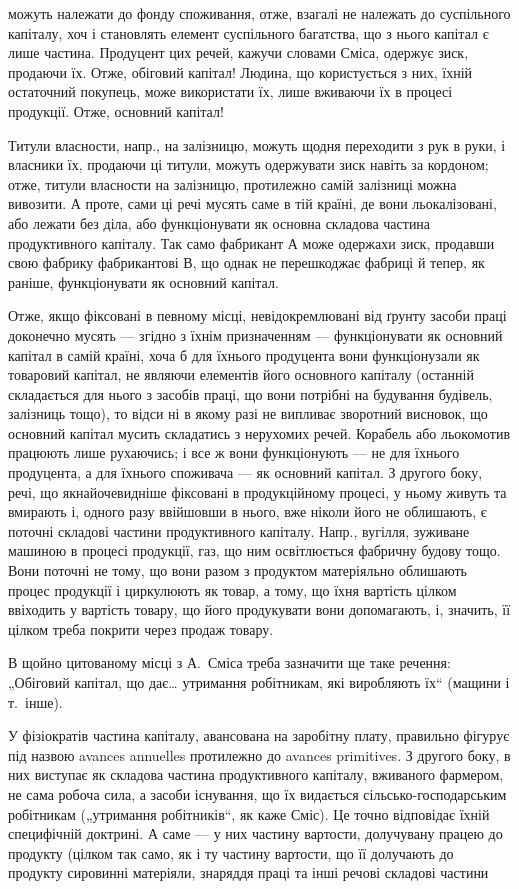 \parcont{}  %
можуть належати до фонду споживання, отже, взагалі не належать до
суспільного капіталу, хоч і становлять елемент суспільного багатства, що
з нього капітал є лише частина. Продуцент цих речей, кажучи словами
Сміса, одержує зиск, продаючи їх. Отже, обіговий капітал! Людина, що
користується з них, їхній остаточний покупець, може використати їх, лише
вживаючи їх в процесі продукції. Отже, основний капітал!

Титули власности, напр., на залізницю, можуть щодня переходити з
рук в руки, і власники їх, продаючи ці титули, можуть одержувати зиск
навіть за кордоном; отже, титули власности на залізницю, протилежно
самій залізниці можна вивозити. А проте, сами ці речі мусять саме в тій
країні, де вони льокалізовані, або лежати без діла, або функціонувати як
основна складова частина продуктивного капіталу. Так само фабрикант
$А$ може одержахи зиск, продавши свою фабрику фабрикантові $В$, що однак
не перешкоджає фабриці й тепер, як раніше, функціонувати як основний
капітал.

Отже, якщо фіксовані в певному місці, невідокремлювані від ґрунту
засоби праці доконечно мусять — згідно з їхнім призначенням — функціонувати
як основний капітал в самій країні, хоча б для їхнього продуцента
вони функціонузали як товаровий капітал, не являючи елементів його
основного капіталу (останній складається для нього з засобів праці, що
вони потрібні на будування будівель, залізниць тощо), то відси ні в
якому разі не випливає зворотний висновок, що основний капітал мусить
складатись з нерухомих речей. Корабель або льокомотив працюють
лише рухаючись; і все ж вони функціонують — не для їхнього продуцента,
а для їхнього споживача — як основний капітал. З другого боку,
речі, що якнайочевидніше фіксовані в продукційному процесі, у ньому
живуть та вмирають і, одного разу ввійшовши в нього, вже ніколи його
не облишають, є поточні складові частини продуктивного капіталу. Напр.,
вугілля, зуживане машиною в процесі продукції, газ, що ним освітлюється
фабричну будову тощо. Вони поточні не тому, що вони разом з
продуктом матеріяльно облишають процес продукції і циркулюють як
товар, а тому, що їхня вартість цілком ввіходить у вартість товару, що
його продукувати вони допомагають, і, значить, її цілком треба покрити
через продаж товару.

В щойно цитованому місці з А.~Сміса треба зазначити ще таке речення:
„Обіговий капітал, що дає\dots{} утримання робітникам, які виробляють
їх“ (мащини і т.~інше).

У фізіократів частина капіталу, авансована на заробітну плату, правильно
фігурує під назвою avances annuelles протилежно до avances primitives.
З другого боку, в них виступає як складова частина продуктивного
капіталу, вживаного фармером, не сама робоча сила, а засоби існування,
що їх видається сільсько-господарським робітникам („утримання
робітників“, як каже Сміс). Це точно відповідає їхній специфічній доктрині.
А саме — у них частину вартости, долучувану працею до продукту
(цілком так само, як і ту частину вартости, що її долучають до продукту
сировинні матеріяли, знаряддя праці та інші речові складові частини
\parbreak{}  %
